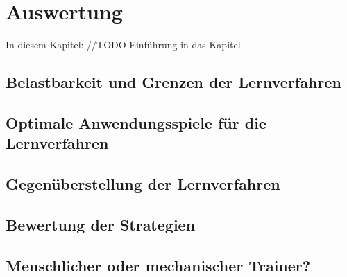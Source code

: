 \chapter{Auswertung}
\label{cha:auswertung}

In diesem Kapitel: //TODO Einführung in das Kapitel

\section{Belastbarkeit und Grenzen der Lernverfahren}

\section{Optimale Anwendungsspiele für die Lernverfahren}

\section{Gegenüberstellung der Lernverfahren}

\section{Bewertung der Strategien}

\section{Menschlicher oder mechanischer Trainer?}